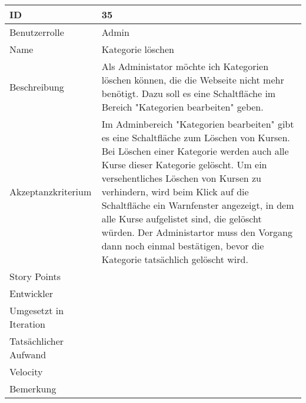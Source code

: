 \begin{tabularx}{\textwidth}{|p{}|X|}
	\hline
	ID & 35\\
	\hline
	Benutzerrolle & Admin\\
	\hline
	Name & Kategorie löschen\\
	\hline
	Beschreibung & Als Administator möchte ich Kategorien löschen können, die die Webseite nicht mehr benötigt. Dazu soll es eine Schaltfläche im Bereich "Kategorien bearbeiten" geben.\\
	\hline
	Akzeptanzkriterium & Im Adminbereich "Kategorien bearbeiten" gibt es eine Schaltfläche zum Löschen von Kursen. Bei Löschen einer Kategorie werden auch alle Kurse dieser Kategorie gelöscht. Um ein versehentliches Löschen von Kursen zu verhindern, wird beim Klick auf die Schaltfläche ein Warnfenster angezeigt, in dem alle Kurse aufgelistet sind, die gelöscht würden. Der Administartor muss den Vorgang dann noch einmal bestätigen, bevor die Kategorie tatsächlich gelöscht wird.\\
	\hline
	Story Points & \\
	\hline
	Entwickler & \\
	\hline
	Umgesetzt in Iteration & \\
	\hline
	Tatsächlicher Aufwand & \\
	\hline
	Velocity & \\
	\hline
	Bemerkung & \\
	\hline
\end{tabularx}
\vspace{20pt}
